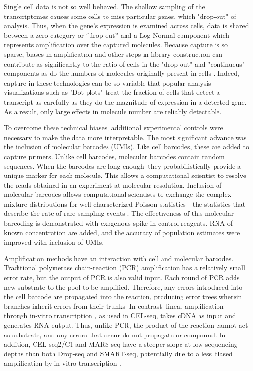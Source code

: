Single cell data is not so well behaved.
The shallow sampling of the transcriptomes causes some cells to miss particular genes, which "drop-out" of analysis. 
Thus, when the gene's expression is examined across cells, data is shared between a zero category or “drop-out” and a Log-Normal component which represents amplification over the captured molecules. 
Because capture is so sparse, biases in amplification and other steps in library construction can contribute as significantly to the ratio of cells in the "drop-out" and "continuous" components as do the numbers of molecules originally present in cells \citep{Zheng2011,Dohm2008}.
Indeed, capture in these technologies can be so variable that popular analysis visualizations such as "Dot plots" treat the fraction of cells that detect a transcript as carefully as they do the magnitude of expression in a detected gene\cite{Shekhar2016}. 
As a result, only large effects in molecule number are reliably detectable. 

To overcome these technical biases, additional experimental controls were necessary to make the data more interpretable. 
The most significant advance was the inclusion of molecular barcodes (UMIs). 
Like cell barcodes, these are added to capture primers. 
Unlike cell barcodes, molecular barcodes contain random sequences. 
When the barcodes are long enough, they probabilistically provide a unique marker for each molecule. 
This allows a computational scientist to resolve the reads obtained in an experiment at molecular resolution. 
Inclusion of molecular barcodes allows computational scientists to exchange the complex mixture distributions for well characterized Poisson statistics---the statistics that describe the rate of rare sampling events \citep{Shiroguchi2012}.
The effectiveness of this molecular barcoding is demonstrated with exogenous spike-in control reagents. 
RNA of known concentration are added, and the accuracy of population estimates were improved with inclusion of UMIs. %

Amplification methods have an interaction with cell and molecular barcodes. 
Traditional polymerase chain-reaction (PCR) amplification has a relatively small error rate, but the output of PCR is also valid input. 
Each round of PCR adds new substrate to the pool to be amplified. 
Therefore, any errors introduced into the cell barcode are propagated into the reaction, producing error trees wherein branches inherit errors from their trunks. 
In contrast, linear amplification through in-vitro transcription \citep{Eberwine1992}, as used in CEL-seq, takes cDNA as input and generates RNA output. Thus, unlike PCR, the product of the reaction cannot act as substrate, and any errors that occur do not propagate or compound.
In addition, CEL-seq2/C1 and MARS-seq have a steeper slope at low sequencing depths than both Drop-seq and SMART-seq, potentially due to a less biased amplification by in vitro transcription \citep{Ziegenhain2017}.

